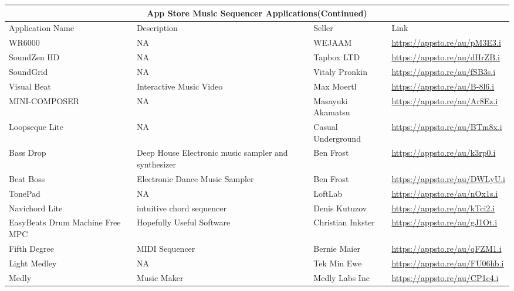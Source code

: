 \newpage
\pagestyle{fancy}
\fancyfoot{}
\fancyfoot[C]{\thepage}

 \begin{tabular}{ |p{3cm}||p{3.5cm}|p{3.5cm}|p{3.5cm}||}
  \hline
  \multicolumn{4}{|c|}{App Store Music Sequencer Applications(Continued)} \\
  \hline
  Application Name   & Description  & Seller & Link\\
  \hline

  WR6000 & NA & WEJAAM &
  \url{https://appsto.re/au/pM3E3.i}\\

  SoundZen HD & NA & Tapbox LTD &
  \url{https://appsto.re/au/dHrZB.i}\\

  SoundGrid & NA & Vitaly Pronkin &
  \url{https://appsto.re/au/fSB3s.i}\\

  Visual Beat & Interactive Music Video & Max Moertl &
  \url{https://appsto.re/au/B-8l6.i}\\

  MINI-COMPOSER & NA & Masayuki Akamatsu &
  \url{https://appsto.re/au/Ar8Ez.i}\\

 Loopseque Lite & NA & Casual Underground &
 \url{https://appsto.re/au/BTm8x.i}\\

 Bass Drop & Deep House Electronic music sampler and synthesizer & Ben Frost &
 \url{https://appsto.re/au/k3rp0.i}\\

 Beat Boss & Electronic Dance Music Sampler & Ben Frost &
 \url{https://appsto.re/au/DWLyU.i}\\

 TonePad &NA& LoftLab &
 \url{https://appsto.re/au/nOx1s.i}\\

 Navichord Lite & intuitive chord sequencer & Denis Kutuzov &
 \url{https://appsto.re/au/kTci2.i}\\

 EasyBeats Drum Machine Free MPC & Hopefully Useful Software & Christian Inkster &
 \url{https://appsto.re/au/gJ1Ot.i}\\

 Fifth Degree & MIDI Sequencer & Bernie Maier &
 \url{https://appsto.re/au/qFZM1.i}\\

 Light Medley & NA & Tek Min Ewe &
 \url{https://appsto.re/au/FU06hb.i}\\

 Medly &  Music Maker & Medly Labs Inc &
 \url{https://appsto.re/au/CP1c4.i}\\

 \hline
\end{tabular}
